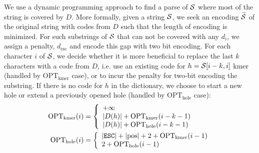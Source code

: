 \documentclass[12pt]{cmuthesis}
\begin{document}

  We use a dynamic programming approach to find a parse of $\mathcal{S}$ where most of the string is covered by $D$. More formally, given a string $\mathcal{S}$, we seek an encoding $\widetilde{\mathcal{S}}$ of the original string with codes from $D$ such that the length of encoding is minimized. For such substrings of $\mathcal{S}$ that can not be covered with any $d_i$, we assign a penalty, $d_{\mathrm{esc}}$ and encode this gap with two bit encoding. For each character $i$ of $\mathcal{S}$, we decide whether it is more beneficial to replace the last $k$ characters with a code from $D$, i.e. use an existing code for $h = \mathcal{S}[i-k,i]$ kmer (handled by $\mathrm{OPT_{kmer}}$ case), or to incur the penalty for two-bit encoding the substring. If there is no code for $h$ in the dictionary, we choose to start a new hole or extend a previously opened hole (handled by $\mathrm{OPT_{hole}}$ case):
  \begin{align}
  \mathrm{OPT_{kmer}}(i) & = \left \{
      \begin{array}{l l}
        + \infty \\
        |D(h)| + \mathrm{OPT_{kmer}}(i-k-1) \\
        |D(h)| + \mathrm{OPT_{hole}}(i-k-1) \\
      \end{array} \right. \\
  \mathrm{OPT_{hole}}(i) & = \left \{
      \begin{array}{l l}
        |\texttt{ESC}| + |\mathrm{pos}| + 2 + \mathrm{OPT_{kmer}}(i-1) \\
        2 + \mathrm{OPT_{hole}}(i-1) \\
      \end{array} \right.
    \label{eqn:denovo:twobit}
  \end{align}
\end{document}
